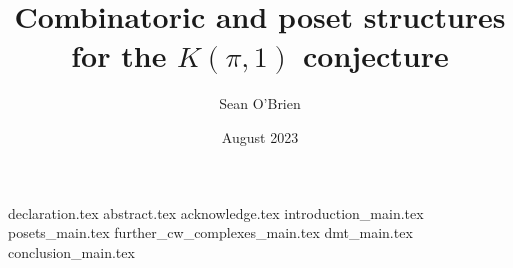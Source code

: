\documentclass[msc]{guthesis}
\title{Combinatoric and poset structures for the $K(\pi,1)$ conjecture}
\author{Sean O'Brien}
\date{August 2023}
\begin{document}
\maketitle
{declaration.tex}
{abstract.tex}
{acknowledge.tex}
\tableofcontents
{introduction_main.tex}
{posets_main.tex}
{further_cw_complexes_main.tex}
{dmt_main.tex}
{conclusion_main.tex}




\end{document}
